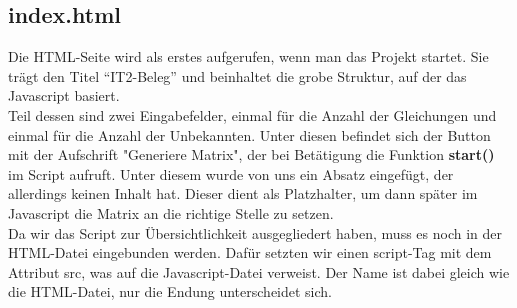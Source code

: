 \documentclass[a4paper,oneside,titlepage,12pt]{article}
\begin{document}
\subsection{index.html}
Die HTML-Seite wird als erstes aufgerufen, wenn man das Projekt startet. Sie trägt den Titel ``IT2-Beleg'' und beinhaltet die grobe Struktur, auf der das Javascript basiert. \\ Teil dessen sind zwei Eingabefelder, einmal für die Anzahl der Gleichungen und einmal für die Anzahl der Unbekannten. Unter diesen befindet sich der Button mit der Aufschrift "Generiere Matrix", der bei Betätigung die Funktion \textbf{start()} im Script aufruft. Unter diesem wurde von uns ein Absatz eingefügt, der allerdings keinen Inhalt hat. Dieser dient als Platzhalter, um dann später im Javascript die Matrix an die richtige Stelle zu setzen. \\ Da wir das Script zur Übersichtlichkeit ausgegliedert haben, muss es noch in der HTML-Datei eingebunden werden. Dafür setzten wir einen script-Tag mit dem Attribut src, was auf die Javascript-Datei verweist. Der Name ist dabei gleich wie die HTML-Datei, nur die Endung unterscheidet sich.
\end{document}
